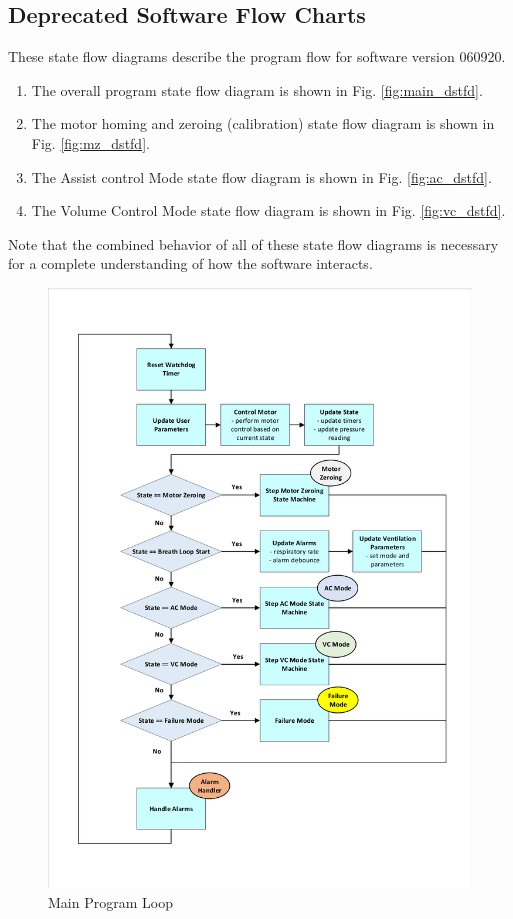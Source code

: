 \documentclass[]{article}
\begin{document}
\begin{appendices}
\clearpage
\section{Deprecated Software Flow Charts}

These state flow diagrams describe the program flow for software version 060920.

\begin{enumerate}
	\item The overall program state flow diagram is shown in Fig. \ref{fig:main_dstfd}.
	\item The motor homing and zeroing (calibration) state flow diagram is shown in Fig. \ref{fig:mz_dstfd}.
	\item The Assist control Mode state flow diagram is shown in Fig. \ref{fig:ac_dstfd}.
	\item The Volume Control Mode state flow diagram is shown in Fig. \ref{fig:vc_dstfd}.
\end{enumerate}

Note that the combined behavior of all of these state flow diagrams is necessary for a complete understanding of how the software interacts.

\begin{figure}
	\includegraphics[scale= 0.82, trim=15 60 15 60, clip]{figures/main_loop_deprecated.pdf}
	\caption{Main Program Loop}
	\label{fig:main_dloop}
\end{figure}


\end{appendices}
\end{document}
